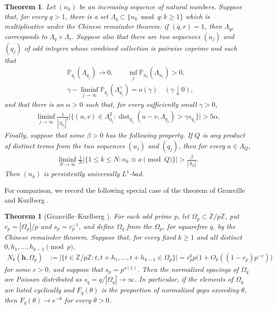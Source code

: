 \documentclass[12pt,reqno]{amsart}
\numberwithin{equation}{section}
\newtheorem{theorem}[equation]{Theorem}
\theoremstyle{definition}
\theoremstyle{remark}
\begin{document}
\begin{theorem}\label{t:l1badblackbox}
Let $(n_k)$ be an increasing sequence of natural numbers.  Suppose that, for
every $q>1$, there is a set $\Lambda_q\subset\{n_k\bmod q:k\geq1\}$
which is multiplicative under the Chinese remainder theorem: if $(q,r)=1$,
then $\Lambda_{qr}$ corresponds to $\Lambda_q\times\Lambda_r$. Suppose also that there are two sequences \((u_j)\) and \((q_j)\) of
odd integers whose combined collection is pairwise coprime and such that
\begin{align}
 &\mathbb P_{q_j}(\Lambda_{q_j})\longrightarrow0,
 \qquad
 \inf_j\mathbb P_{u_j}(\Lambda_{u_j})>0,
 \label{e:l1-density}\\
 &\gamma-\liminf_{j\to\infty}
       \mathbb P_{q_j}(\Lambda_{q_j}^{\gamma})=o(\gamma)
       \quad(\gamma\downarrow0),\label{e:l1-thickening}
\end{align}
and that there is an $\alpha>0$ such that, for every sufficiently small
$\gamma>0$,
\begin{align}
 \liminf_{j\to\infty}\frac1{|\Lambda_{q_j}|^2}
 \big|\{(u,v)\in\Lambda_{q_j}^2:
   \operatorname{dist}_{q_j}(u-v,\Lambda_{q_j})>
       \gamma s_{q_j}\}\big|>5\alpha.             \label{e:l1-difference}
\end{align}
Finally, suppose that some $\beta>0$ has the following property. If \(Q\) is any product of distinct terms from the two sequences
\((u_j)\) and \((q_j)\), then for every \(a\in\Lambda_Q\),
\begin{align}
 \liminf_{N\to\infty}\frac1N
 \big|\{1\leq k\leq N:n_k\equiv a\pmod Q\}\big|
       >\frac{\beta}{|\Lambda_Q|}.                 \label{e:l1-equidistribution}
\end{align}
Then $(n_k)$ is persistently universally $L^1$-bad.
\end{theorem}





For comparison, we record the following special case of the theorem of
Granville and Kurlberg \cite[Theorem 1]{GK08}.

\begin{theorem}[Granville--Kurlberg \cite{GK08}]\label{t:grankul}
For each odd prime $p$, let $\Omega_p\subset\mathbb Z/p\mathbb Z$, put
$r_p=|\Omega_p|/p$ and $s_p=r_p^{-1}$, and define $\Omega_q$ from the
$\Omega_p$, for squarefree $q$, by the Chinese remainder theorem.  Suppose
that, for every fixed $k\geq1$ and all distinct
$0,h_1,\ldots,h_{k-1}\pmod p$,
\begin{align}
 N_k(\mathbf h,\Omega_p)
 &:=\big|\{t\in \mathbb{Z}/p\mathbb{Z}:t,t+h_1,\ldots,t+h_{k-1}\in\Omega_p\}\big|=r_p^kp\big(1+O_k((1-r_p)p^{-c})\big)             \label{e:GK-hyp}
\end{align}
for some $c>0$, and suppose that $s_p=p^{o(1)}$.  Then the normalized spacings
of $\Omega_q$ are Poisson distributed as $s_q=q/|\Omega_q|\to\infty$.
In particular, if the elements of $\Omega_q$ are listed cyclically and
$F_q(\theta)$ is the proportion of normalized gaps exceeding $\theta$, then
$F_q(\theta)\to e^{-\theta}$ for every $\theta>0$.
\end{theorem}
\end{document}
